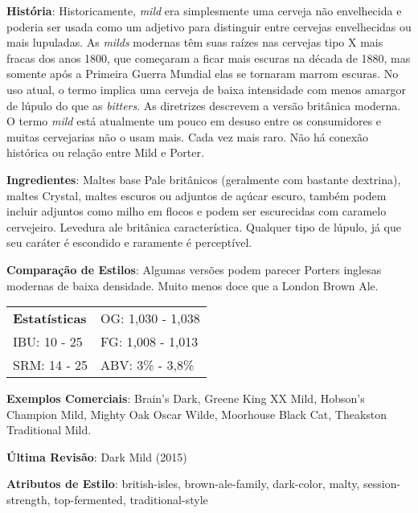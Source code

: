 \textbf{História}: Historicamente, \textit{mild} era simplesmente uma cerveja não envelhecida e poderia ser usada como um adjetivo para distinguir entre cervejas envelhecidas ou mais lupuladas. As \textit{milds} modernas têm suas raízes nas cervejas tipo X mais fracas dos anos 1800, que começaram a ficar mais escuras na década de 1880, mas somente após a Primeira Guerra Mundial elas se tornaram marrom escuras. No uso atual, o termo implica uma cerveja de baixa intensidade com menos amargor de lúpulo do que as \textit{bitters}. As diretrizes descrevem a versão britânica moderna. O termo \textit{mild} está atualmente um pouco em desuso entre os consumidores e muitas cervejarias não o usam mais. Cada vez mais raro. Não há conexão histórica ou relação entre Mild e Porter.

\textbf{Ingredientes}: Maltes base Pale britânicos (geralmente com bastante dextrina), maltes Crystal, maltes escuros ou adjuntos de açúcar escuro, também podem incluir adjuntos como milho em flocos e podem ser escurecidas com caramelo cervejeiro. Levedura ale britânica característica. Qualquer tipo de lúpulo, já que seu caráter é escondido e raramente é perceptível.

\textbf{Comparação de Estilos}: Algumas versões podem parecer Porters inglesas modernas de baixa densidade. Muito menos doce que a London Brown Ale.

\begin{tabular}{@{}p{35mm}p{35mm}@{}}
  \textbf{Estatísticas} & OG: 1,030 - 1,038 \\
  IBU: 10 - 25  & FG: 1,008 - 1,013  \\
  SRM: 14 - 25  & ABV: 3\% - 3,8\%
\end{tabular}

\textbf{Exemplos Comerciais}: Brain's Dark, Greene King XX Mild, Hobson's Champion Mild, Mighty Oak Oscar Wilde, Moorhouse Black Cat, Theakston Traditional Mild.

\textbf{Última Revisão}: Dark Mild (2015)

\textbf{Atributos de Estilo}: british-isles, brown-ale-family, dark-color, malty, session-strength, top-fermented, traditional-style
